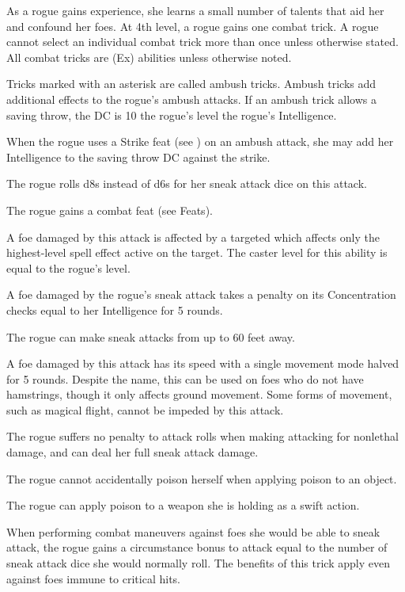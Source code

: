  As a rogue gains experience, she learns a small number of talents that aid her and confound her foes. At 4th level, a rogue gains one combat trick. A rogue cannot select an individual combat trick more than once unless otherwise stated. All combat tricks are (Ex) abilities unless otherwise noted.

\par Tricks marked with an asterisk are called ambush tricks. Ambush tricks add additional effects to the rogue's ambush attacks. If an ambush trick allows a saving throw, the DC is 10 \add the rogue's level \add the rogue's Intelligence.

 When the rogue uses a Strike feat (see ) on an ambush attack, she may add her Intelligence to the saving throw DC against the strike.

 The rogue rolls d8s instead of d6s for her sneak attack dice on this attack.

 The rogue gains a combat feat (see Feats).

 A foe damaged by this attack is affected by a targeted  which affects only the highest-level spell effect active on the target. The caster level for this ability is equal to the rogue's level.

 A foe damaged by the rogue's sneak attack takes a penalty on its Concentration checks equal to her Intelligence for 5 rounds.

 The rogue can make sneak attacks from up to 60 feet away.

 A foe damaged by this attack has its speed with a single movement mode halved for 5 rounds. Despite the name, this can be used on foes who do not have hamstrings, though it only affects ground movement. Some forms of movement, such as magical flight, cannot be impeded by this attack.

 The rogue suffers no penalty to attack rolls when making attacking for nonlethal damage, and can deal her full sneak attack damage.

 The rogue cannot accidentally poison herself when applying poison to an object.

 The rogue can apply poison to a weapon she is holding as a swift action.

 When performing combat maneuvers against foes she would be able to sneak attack, the rogue gains a circumstance bonus to attack equal to the number of sneak attack dice she would normally roll. The benefits of this trick apply even against foes immune to critical hits.

